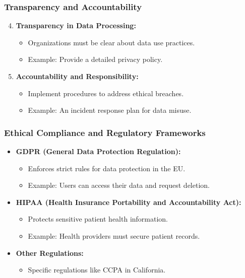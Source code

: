 \documentclass{beamer}
\begin{document}
\begin{frame}[fragile]
    \frametitle{Transparency and Accountability}
    \begin{enumerate}
        \setcounter{enumi}{3}
        \item \textbf{Transparency in Data Processing:}
            \begin{itemize}
                \item Organizations must be clear about data use practices.
                \item Example: Provide a detailed privacy policy.
            \end{itemize}
        
        \item \textbf{Accountability and Responsibility:}
            \begin{itemize}
                \item Implement procedures to address ethical breaches.
                \item Example: An incident response plan for data misuse.
            \end{itemize}
    \end{enumerate}
\end{frame}

\begin{frame}[fragile]
    \frametitle{Ethical Compliance and Regulatory Frameworks}
    \begin{itemize}
        \item \textbf{GDPR (General Data Protection Regulation):}
            \begin{itemize}
                \item Enforces strict rules for data protection in the EU.
                \item Example: Users can access their data and request deletion.
            \end{itemize}
        
        \item \textbf{HIPAA (Health Insurance Portability and Accountability Act):}
            \begin{itemize}
                \item Protects sensitive patient health information.
                \item Example: Health providers must secure patient records.
            \end{itemize}
        
        \item \textbf{Other Regulations:}
            \begin{itemize}
                \item Specific regulations like CCPA in California.
            \end{itemize}
    \end{itemize}
\end{frame}
\end{document}
